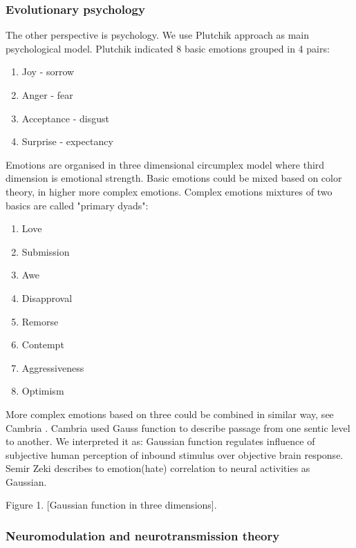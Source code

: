 \subsubsection{Evolutionary psychology}

The other perspective is psychology.  We use Plutchik approach\cite{natureofemotions} as main psychological model. Plutchik indicated 8 basic emotions grouped in 4 pairs:

\begin{enumerate}
\item  Joy - sorrow
\item  Anger - fear
\item  Acceptance - disgust
\item  Surprise - expectancy
\end{enumerate}

Emotions are organised in three dimensional circumplex model where third dimension is emotional strength. Basic emotions could be mixed based on color theory, in higher more complex emotions. Complex emotions mixtures of two basics are called "primary dyads":

\begin{enumerate}
\item  Love
\item  Submission
\item  Awe
\item  Disapproval
\item  Remorse
\item  Contempt
\item  Aggressiveness
\item  Optimism
\end{enumerate}

More complex emotions based on three could be combined in similar way, see Cambria \cite{senticcomputing}.
Cambria \cite{hourglass} used Gauss function to describe passage from one sentic level to another. We interpreted it as: Gaussian function regulates influence of subjective human perception of inbound stimulus over objective brain response. Semir Zeki\cite{neuralcorrelatesofhate} describes to emotion(hate) correlation to neural activities as Gaussian.


Figure 1. [Gaussian function in three dimensions].

\subsubsection{Neuromodulation and neurotransmission theory}

